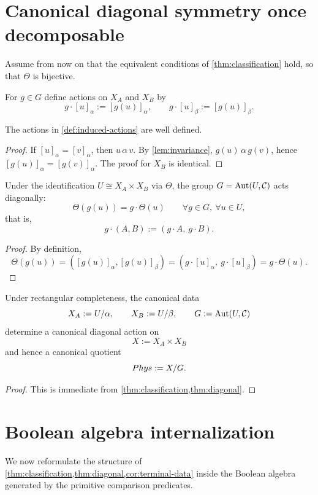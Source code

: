\section{Canonical diagonal symmetry once decomposable}
\label{sec:diagonal}
Assume from now on that the equivalent conditions of
\cref{thm:classification} hold, so that \(\Theta\) is bijective.
\begin{definition}
	\label{def:induced-actions}
	For \(g\in G\) define actions on \(X_A\) and \(X_B\) by
	\[
		g\cdot [u]_\alpha := [g(u)]_\alpha,
		\qquad
		g\cdot [u]_\beta := [g(u)]_\beta.
	\]
\end{definition}
\begin{lemma}
	\label{lem:well-defined-actions}
	The actions in \cref{def:induced-actions} are well defined.
\end{lemma}
\begin{proof}
	If \([u]_\alpha=[v]_\alpha\), then \(u\,\alpha\,v\). By
	\cref{lem:invariance}, \(g(u)\,\alpha\,g(v)\), hence
	\([g(u)]_\alpha=[g(v)]_\alpha\). The proof for \(X_B\) is identical.
\end{proof}
\begin{theorem}
	\label{thm:diagonal}
	Under the identification \(U\cong X_A\times X_B\) via \(\Theta\),
	the group \(G=\operatorname{Aut}(U,\mathcal C)\) acts diagonally:
	\[
		\Theta(g(u))=g\cdot\Theta(u)
		\qquad
		\forall g\in G,\ \forall u\in U,
	\]
	that is,
	\[
		g\cdot(A,B):=(g\cdot A,\ g\cdot B).
	\]
\end{theorem}
\begin{proof}
	By definition,
	\[
		\Theta(g(u))
		=
		([g(u)]_\alpha,[g(u)]_\beta)
		=
		(g\cdot[u]_\alpha,\ g\cdot[u]_\beta)
		=
		g\cdot\Theta(u).
	\]
\end{proof}
\begin{corollary}
	\label{cor:terminal-data}
	Under rectangular completeness, the canonical data
	\[
		X_A:=U/\alpha,
		\qquad
		X_B:=U/\beta,
		\qquad
		G:=\operatorname{Aut}(U,\mathcal C)
	\]
	determine a canonical diagonal action on
	\[
		X:=X_A\times X_B
	\]
	and hence a canonical quotient
	\[
		Phys:=X/G.
	\]
\end{corollary}
\begin{proof}
	This is immediate from \cref{thm:classification,thm:diagonal}.
\end{proof}
\section{Boolean algebra internalization}
\label{sec:boolean}
We now reformulate the structure of
\cref{thm:classification,thm:diagonal,cor:terminal-data} inside the
Boolean algebra
generated by the primitive comparison predicates.
